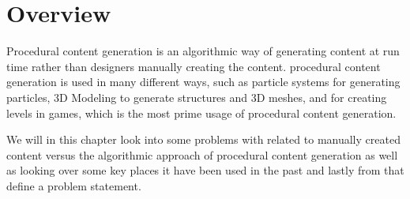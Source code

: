 \chapter{Overview}

Procedural content generation is an algorithmic way of generating content at run time rather than designers manually creating the content. procedural content generation is used in many different ways, such as particle systems for generating particles, 3D Modeling to generate structures and 3D meshes, and for creating levels in games, which is the most prime usage of procedural content generation.

We will in this chapter look into some problems with related to manually created content versus the algorithmic approach of procedural content generation as well as looking over some key places it have been used in the past and lastly from that define a problem statement.